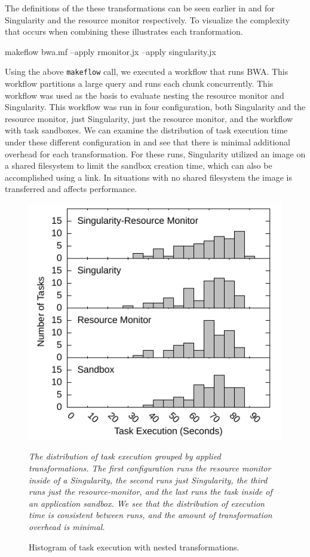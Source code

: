 \documentclass[conference]{IEEEtran}
\begin{document}
The definitions of the these transformations can
be seen earlier in  and 
for Singularity and the resource monitor respectively.
To visualize the complexity that occurs when combining these
 illustrates each tranformation.


\begin{framed}
\noindent
{\small makeflow bwa.mf --apply rmonitor.jx --apply singularity.jx}
\end{framed}

Using the above {\tt makeflow} call, we executed a workflow 
that runs BWA\cite{pmid20080505}.
This workflow partitions a large query and runs 
each chunk concurrently. 
This workflow was used as the basis to evaluate 
nesting the resource monitor and Singularity.
This workflow was run in four configuration,
both Singularity and the resource monitor,
just Singularity,
just the resource monitor,
and the workflow with task sandboxes.
We can examine the distribution of task
execution time under these different 
configuration in 
and see that there is minimal additional
overhead for each transformation.
For these runs, Singularity utilized
an image on a shared filesystem to
limit the sandbox creation time,
which can also be accomplished using
a link. In situations with no shared
filesystem the image is transferred
and affects performance.


\begin{figure}[h]
\includegraphics[width=\columnwidth]{graphics/divide_hist.pdf}
\caption{Histogram of task execution with nested transformations.}
\small
\emph{The distribution of task execution grouped by applied
transformations. 
The first configuration runs the resource monitor inside of
a Singularity, the second runs just Singularity,
the third runs just the resource-monitor, and the last
runs the task inside of an application sandbox.
We see that the distribution of execution
time is consistent between runs, and the amount of 
transformation overhead is minimal.
}
\label{figure:nest-task}
\end{figure}
\end{document}
